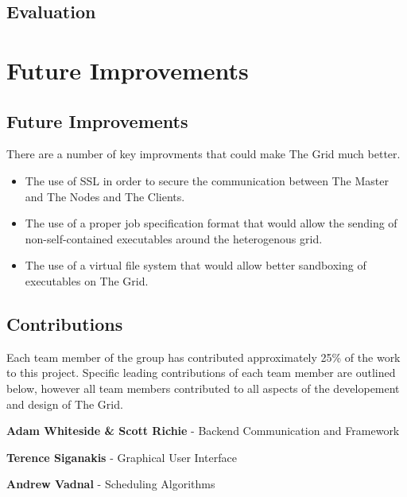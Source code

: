 \chapter{Evaluation}
\label{evaluation}

\part{Future Improvements}
\label{futureimprovements}

\chapter{Future Improvements}
\label{futureimprovements}

There are a number of key improvments that could make The Grid much better.

\begin{itemize}
\item The use of SSL in order to secure the communication between The Master and The Nodes and The Clients.

\item The use of a proper job specification format that would allow the sending of non-self-contained executables around the heterogenous grid.

\item The use of a virtual file system that would allow better sandboxing of executables on The Grid.

\end{itemize}

 \clearpage \chapter{Contributions}
\label{contributions}

Each team member of the group has contributed approximately 25\% of the work to this project. Specific leading contributions of each team member are outlined below, however all team members contributed to all aspects of the developement and design of The Grid. 

\textbf{Adam Whiteside \& Scott Richie} - Backend Communication and Framework

\textbf{Terence Siganakis} - Graphical User Interface

\textbf{Andrew Vadnal} - Scheduling Algorithms




